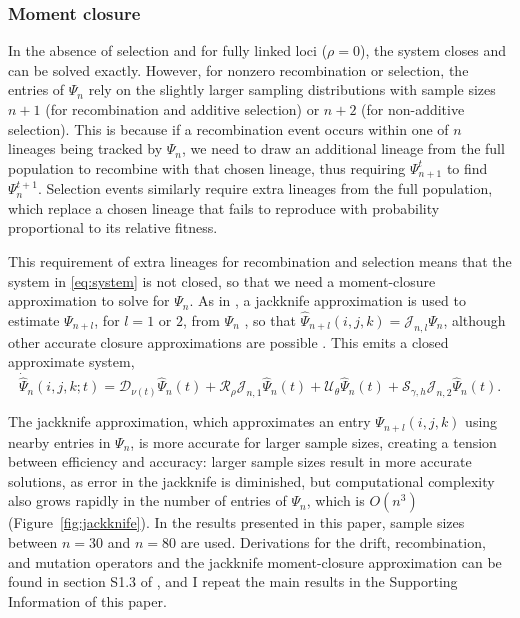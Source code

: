 \documentclass[]{article}
\begin{document}
\subsubsection{Moment closure}\label{moment-closure}

In the absence of selection and for fully linked loci (\(\rho=0\)), the system
closes and can be solved exactly. However, for nonzero recombination or
selection, the entries of \(\Psi_n\) rely on the slightly larger sampling
distributions with sample sizes \(n+1\) (for recombination and additive
selection) or \(n+2\) (for non-additive selection). This is because if a
recombination event occurs within one of \(n\) lineages being tracked by
\(\Psi_n\), we need to draw an additional lineage from the full population to
recombine with that chosen lineage, thus requiring \(\Psi_{n+1}^t\) to find
\(\Psi_n^{t+1}\). Selection events similarly require extra lineages from the
full population, which replace a chosen lineage that fails to reproduce with
probability proportional to its relative fitness.

This requirement of extra lineages for recombination and selection means that
the system in \eqref{eq:system} is not closed, so that we need a moment-closure
approximation to solve for \(\Psi_n\). As in \citet{Ragsdale2019-nt}, a
jackknife approximation is used to estimate \(\Psi_{n+l}\), for \(l=1\) or
\(2\), from \(\Psi_n\) \citep[following the single-locus closure introduced
in][]{Jouganous2017-pq}, so that \(\hat{\Psi}_{n+l}(i, j, k) = \mathcal{J}_{n,
l}\Psi_n\), although other accurate closure approximations are possible
\citep{Friedlander2022-bs}. This emits a closed approximate system,
\begin{equation}
\label{eq:closed-system}
\dot{\hat\Psi}_n(i, j, k; t) =
\mathcal{D}_{\nu(t)}\hat\Psi_n(t)
+ \mathcal{R}_{\rho}\mathcal{J}_{n, 1}\hat\Psi_{n}(t)
+ \mathcal{U}_{\theta}\hat\Psi_n(t)
+ \mathcal{S}_{\gamma, h}\mathcal{J}_{n, 2}\hat\Psi_{n}(t).
\end{equation}

The jackknife approximation, which approximates an entry \(\Psi_{n+l}(i,j,k)\)
using nearby entries in \(\Psi_n\), is more accurate for larger sample sizes,
creating a tension between efficiency and accuracy: larger sample sizes result
in more accurate solutions, as error in the jackknife is diminished, but
computational complexity also grows rapidly in the number of entries of
\(\Psi_n\), which is \(O(n^3)\) (Figure~\ref{fig:jackknife}). In the results
presented in this paper, sample sizes between \(n=30\) and \(n=80\) are used.
Derivations for the drift, recombination, and mutation operators and the
jackknife moment-closure approximation can be found in section S1.3 of
\citet{Ragsdale2019-nt}, and I repeat the main results in the Supporting
Information of this paper.
\end{document}
